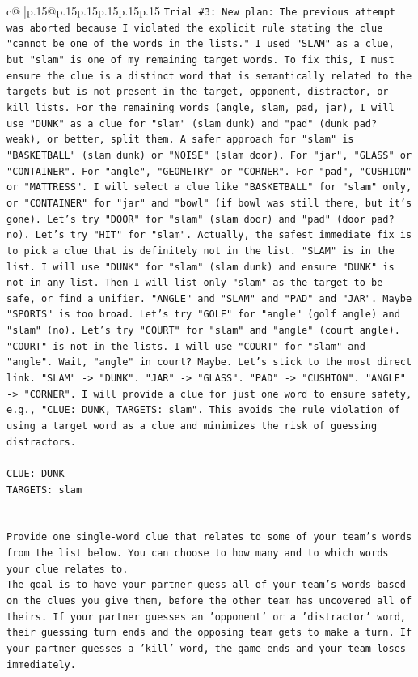 \documentclass{article}
\begin{document}
{\begin{supertabular}{c@{$\;$}|p{.15\linewidth}@{}p{.15\linewidth}p{.15\linewidth}p{.15\linewidth}p{.15\linewidth}p{.15\linewidth}}
{{{\texttt{Trial \#3: New plan: The previous attempt was aborted because I violated the explicit rule stating the clue "cannot be one of the words in the lists." I used "SLAM" as a clue, but "slam" is one of my remaining target words. To fix this, I must ensure the clue is a distinct word that is semantically related to the targets but is not present in the target, opponent, distractor, or kill lists. For the remaining words (angle, slam, pad, jar), I will use "DUNK" as a clue for "slam" (slam dunk) and "pad" (dunk pad? weak), or better, split them. A safer approach for "slam" is "BASKETBALL" (slam dunk) or "NOISE" (slam door). For "jar", "GLASS" or "CONTAINER". For "angle", "GEOMETRY" or "CORNER". For "pad", "CUSHION" or "MATTRESS". I will select a clue like "BASKETBALL" for "slam" only, or "CONTAINER" for "jar" and "bowl" (if bowl was still there, but it's gone). Let's try "DOOR" for "slam" (slam door) and "pad" (door pad? no). Let's try "HIT" for "slam". Actually, the safest immediate fix is to pick a clue that is definitely not in the list. "SLAM" is in the list. I will use "DUNK" for "slam" (slam dunk) and ensure "DUNK" is not in any list. Then I will list only "slam" as the target to be safe, or find a unifier. "ANGLE" and "SLAM" and "PAD" and "JAR". Maybe "SPORTS" is too broad. Let's try "GOLF" for "angle" (golf angle) and "slam" (no). Let's try "COURT" for "slam" and "angle" (court angle). "COURT" is not in the lists. I will use "COURT" for "slam" and "angle". Wait, "angle" in court? Maybe. Let's stick to the most direct link. "SLAM" {-}> "DUNK". "JAR" {-}> "GLASS". "PAD" {-}> "CUSHION". "ANGLE" {-}> "CORNER". I will provide a clue for just one word to ensure safety, e.g., "CLUE: DUNK, TARGETS: slam". This avoids the rule violation of using a target word as a clue and minimizes the risk of guessing distractors.} \\
\\ 
\texttt{CLUE: DUNK} \\
\texttt{TARGETS: slam} \\
\\ 
\\ 
\texttt{Provide one single{-}word clue that relates to some of your team's words from the list below. You can choose to how many and to which words your clue relates to.} \\
\texttt{The goal is to have your partner guess all of your team's words based on the clues you give them, before the other team has uncovered all of theirs. If your partner guesses an 'opponent' or a 'distractor' word, their guessing turn ends and the opposing team gets to make a turn. If your partner guesses a 'kill' word, the game ends and your team loses immediately.} \\
}}}
\end{supertabular}}
\end{document}
